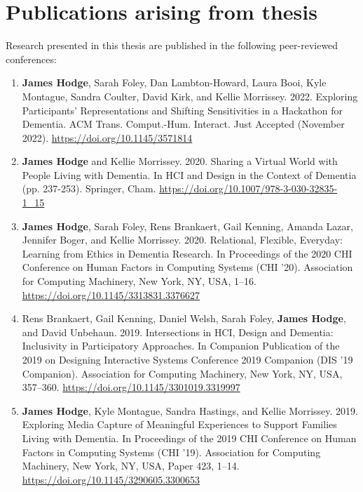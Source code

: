 \chapter{Publications arising from thesis}
\label{Publications}
Research presented in this thesis are published in the following peer-reviewed conferences:

\begin{enumerate}

    \item \textbf{James Hodge}, Sarah Foley, Dan Lambton-Howard, Laura Booi, Kyle Montague, Sandra Coulter, David Kirk, and Kellie Morrissey. 2022. Exploring Participants’ Representations and Shifting Sensitivities in a Hackathon for Dementia. ACM Trans. Comput.-Hum. Interact. Just Accepted (November 2022). \href{https://doi.org/10.1145/3571814}{https://doi.org/10.1145/3571814}

    \item \textbf{James Hodge} and Kellie Morrissey. 2020. Sharing a Virtual World with People Living with Dementia. In HCI and Design in the Context of Dementia (pp. 237-253). Springer, Cham. \href{https://doi.org/10.1007/978-3-030-32835-1\_15}{https://doi.org/10.1007/978-3-030-32835-1\_15}

    \item \textbf{James Hodge}, Sarah Foley, Rens Brankaert, Gail Kenning, Amanda Lazar, Jennifer Boger, and Kellie Morrissey. 2020. Relational, Flexible, Everyday: Learning from Ethics in Dementia Research. In Proceedings of the 2020 CHI Conference on Human Factors in Computing Systems (CHI '20). Association for Computing Machinery, New York, NY, USA, 1–16. \href{https://doi.org/10.1145/3313831.3376627}{https://doi.org/10.1145/3313831.3376627}

    \item Rens Brankaert, Gail Kenning, Daniel Welsh, Sarah Foley, \textbf{James Hodge}, and David Unbehaun. 2019. Intersections in HCI, Design and Dementia: Inclusivity in Participatory Approaches. In Companion Publication of the 2019 on Designing Interactive Systems Conference 2019 Companion (DIS '19 Companion). Association for Computing Machinery, New York, NY, USA, 357–360. \href{https://doi.org/10.1145/3301019.3319997}{https://doi.org/10.1145/3301019.3319997}

    \item \textbf{James Hodge}, Kyle Montague, Sandra Hastings, and Kellie Morrissey. 2019. Exploring Media Capture of Meaningful Experiences to Support Families Living with Dementia. In Proceedings of the 2019 CHI Conference on Human Factors in Computing Systems (CHI '19). Association for Computing Machinery, New York, NY, USA, Paper 423, 1–14. \href{https://doi.org/10.1145/3290605.3300653}{https://doi.org/10.1145/3290605.3300653}


\end{enumerate}
